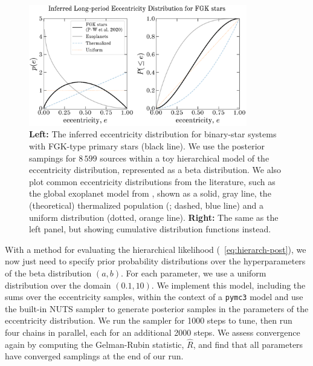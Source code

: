 \documentclass[modern]{aastex63}
\begin{document}
\begin{figure}[!t]
    \begin{center}
    \includegraphics[width=0.85\textwidth]{eccentricity-distr.pdf}
    \end{center}
    \caption{%
    \textbf{Left:} The inferred eccentricity distribution for binary-star
    systems with FGK-type primary stars (black line).
    We use the posterior sampings for $8\,599$ sources within a toy hierarchical
    model of the eccentricity distribution, represented as a beta distribution.
    We also plot common eccentricity distributions from the literature, such as
    the global exoplanet model from \citet{Kipping:2013}, shown as a solid, gray
    line, the (theoretical) thermalized population (\citealt{Jeans:1919};
    dashed, blue line) and a uniform distribution (dotted, orange line).
    \textbf{Right:} The same as the left panel, but showing cumulative
    distribution functions instead.
    \label{fig:eccdist}
    }
\end{figure}

With a method for evaluating the hierarchical likelihood
(\equationname~\ref{eq:hierarch-post}), we now just need to specify prior
probability distributions over the hyperparameters of the beta distribution $(a,
b)$.
For each parameter, we use a uniform distribution over the domain $(0.1, 10)$.
We implement this model, including the sums over the eccentricity samples,
within the context of a \texttt{pymc3} model and use the built-in NUTS sampler
to generate posterior samples in the parameters of the eccentricity
distribution.
We run the sampler for 1000 steps to tune, then run four chains in parallel,
each for an additional 2000 steps.
We assess convergence again by computing the Gelman-Rubin statistic, $\hat{R}$,
and find that all parameters have converged samplings at the end of our run.
\end{document}
